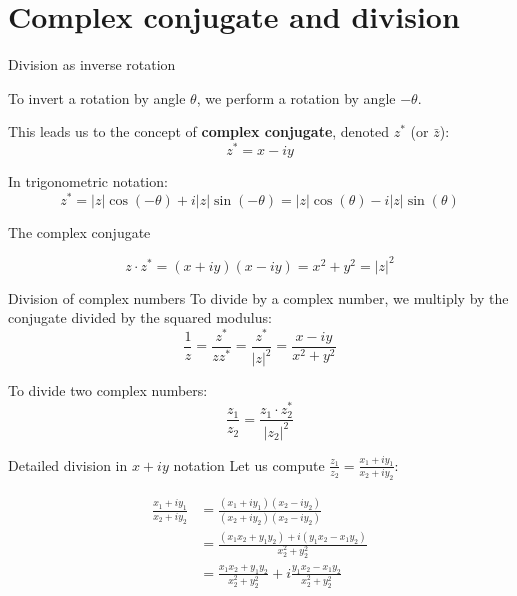 \documentclass[aspectratio=169,12pt]{beamer}
\begin{document}
\section{Complex conjugate and division}

\begin{frame}{Division as inverse rotation}
  
  To invert a rotation by angle $\theta$, we perform a rotation by angle $-\theta$.
  
  \bigskip
  This leads us to the concept of \textbf{complex conjugate}, denoted $z^*$ (or $\bar{z}$):
  \[
    z^* = x - iy
  \]
  
  In trigonometric notation:
  \[
    z^* = |z|\cos(-\theta) + i|z|\sin(-\theta) = |z|\cos(\theta) - i|z|\sin(\theta)
  \]
  
\end{frame}

\begin{frame}{The complex conjugate}
  \begin{center}
  \end{center}
  
  \[
    z \cdot z^* = (x + iy)(x - iy) = x^2 + y^2 = |z|^2
  \]
\end{frame}

\begin{frame}{Division of complex numbers}
  To divide by a complex number, we multiply by the conjugate divided by the squared modulus:
  \[
    \frac{1}{z} = \frac{z^*}{zz^*} = \frac{z^*}{|z|^2} = \frac{x - iy}{x^2 + y^2}
  \]
  
  \bigskip
  To divide two complex numbers:
  \[
    \frac{z_1}{z_2} = \frac{z_1 \cdot z_2^*}{|z_2|^2}
  \]
\end{frame}

\begin{frame}{Detailed division in $x + iy$ notation}
  Let us compute $\frac{z_1}{z_2} = \frac{x_1 + iy_1}{x_2 + iy_2}$:
  
  \begin{align*}
    \frac{x_1 + iy_1}{x_2 + iy_2} &= \frac{(x_1 + iy_1)(x_2 - iy_2)}{(x_2 + iy_2)(x_2 - iy_2)} \\
    &= \frac{(x_1 x_2 + y_1 y_2) + i(y_1 x_2 - x_1 y_2)}{x_2^2 + y_2^2} \\
    &= \frac{x_1 x_2 + y_1 y_2}{x_2^2 + y_2^2} + i\frac{y_1 x_2 - x_1 y_2}{x_2^2 + y_2^2}
  \end{align*}
\end{frame}
\end{document}
